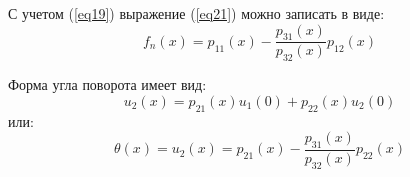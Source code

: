 С учетом (\ref{eq19}) выражение (\ref{eq21}) можно записать в виде:
\begin{equation}
    \label{eq22}
    f_n(x) = p_{11}(x) - \frac{p_{31}(x)}{p_{32}(x)} p_{12}(x)
\end{equation}

Форма угла поворота имеет вид:
\begin{equation}
    \label{eq23}
    u_2(x) = p_{21}(x) u_1(0) + p_{22}(x) u_2(0)
\end{equation}
или:
\begin{equation}
    \label{eq24}
    \theta(x) = u_2(x) = p_{21}(x) - \frac{p_{31}(x)}{p_{32}(x)} p_{22}(x)
\end{equation}

